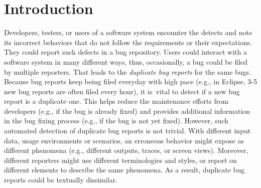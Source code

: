 \section{Introduction}
\label{intro}


Developers, testers, or users of a software system encounter the
detects and note its incorrect behaviors that do not follow the
requirements or their expectations. They could report such defects in
a bug repository.
%
%
Users could interact with a software system in many different ways,
thus, occasionally, a bug could be filed by multiple reporters. That
leads to the {\em duplicate bug reports} for the same bugs. Because
bug reports keep being filed everyday with high pace (e.g., in
Eclipse, 3-5 new bug reports are often filed every hour), it is~vital
to detect if a new bug report is a duplicate one. This
helps reduce the maintenance efforts from developers (e.g., if the bug
is already fixed) and provides additional information in the bug
fixing process (e.g., if the bug is not yet fixed).
%
However, such automated detection of duplicate bug reports is not
trivial. With different input data, usage environments or scenarios,
an erroneous behavior might expose as different phenomena (e.g.,
different outputs, traces, or screen views). Moreover, different
reporters might use different terminologies and styles, or report on
different elements to describe the same phenomena. As a result,
duplicate bug reports could be textually dissimilar.



